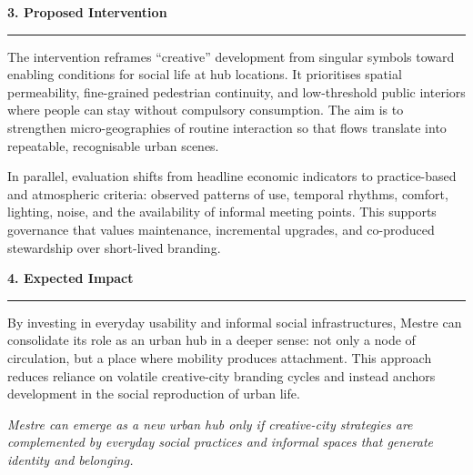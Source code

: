 \documentclass[10pt]{article}
\newcommand{\sechead}[1]{%
\vspace{2pt}%
{\color{Title}\large\bfseries #1}\par
\vspace{1pt}%
\textcolor{Rule}{\rule{\linewidth}{0.6pt}}\par
\vspace{-2pt}%
}
\begin{document}
\sechead{3. Proposed Intervention}
\justifying
The intervention reframes “creative” development from singular symbols toward enabling conditions for social life at hub locations. It prioritises spatial permeability, fine-grained pedestrian continuity, and low-threshold public interiors where people can stay without compulsory consumption. The aim is to strengthen micro-geographies of routine interaction so that flows translate into repeatable, recognisable urban scenes.

In parallel, evaluation shifts from headline economic indicators to practice-based and atmospheric criteria: observed patterns of use, temporal rhythms, comfort, lighting, noise, and the availability of informal meeting points. This supports governance that values maintenance, incremental upgrades, and co-produced stewardship over short-lived branding.

\sechead{4. Expected Impact}
\justifying
By investing in everyday usability and informal social infrastructures, Mestre can consolidate its role as an urban hub in a deeper sense: not only a node of circulation, but a place where mobility produces attachment. This approach reduces reliance on volatile creative-city branding cycles and instead anchors development in the social reproduction of urban life.

\textit{Mestre can emerge as a new urban hub only if creative-city strategies are complemented by everyday social practices and informal spaces that generate identity and belonging.}

\vspace{4pt}
\end{document}
